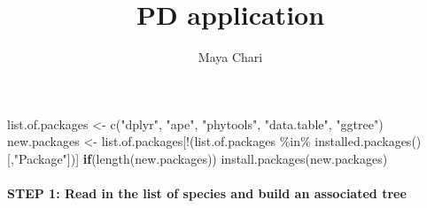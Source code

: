 \documentclass[
]{article}
\title{PD application}
\author{Maya Chari}
\date{}
\newenvironment{Shaded}{\begin{snugshade}}{\end{snugshade}}
\newcommand{\ControlFlowTok}[1]{\textcolor[rgb]{0.13,0.29,0.53}{\textbf{#1}}}
\newcommand{\FunctionTok}[1]{\textcolor[rgb]{0.00,0.00,0.00}{#1}}
\newcommand{\NormalTok}[1]{#1}
\newcommand{\OtherTok}[1]{\textcolor[rgb]{0.56,0.35,0.01}{#1}}
\newcommand{\SpecialCharTok}[1]{\textcolor[rgb]{0.00,0.00,0.00}{#1}}
\newcommand{\StringTok}[1]{\textcolor[rgb]{0.31,0.60,0.02}{#1}}
\begin{document}
\maketitle

\begin{Shaded}
\begin{Highlighting}[]
\NormalTok{list.of.packages }\OtherTok{\textless{}{-}} \FunctionTok{c}\NormalTok{(}\StringTok{"dplyr"}\NormalTok{, }\StringTok{"ape"}\NormalTok{, }\StringTok{"phytools"}\NormalTok{, }\StringTok{"data.table"}\NormalTok{, }\StringTok{"ggtree"}\NormalTok{)}
\NormalTok{new.packages }\OtherTok{\textless{}{-}}\NormalTok{ list.of.packages[}\SpecialCharTok{!}\NormalTok{(list.of.packages }\SpecialCharTok{\%in\%} \FunctionTok{installed.packages}\NormalTok{()[,}\StringTok{"Package"}\NormalTok{])]}
\ControlFlowTok{if}\NormalTok{(}\FunctionTok{length}\NormalTok{(new.packages)) }\FunctionTok{install.packages}\NormalTok{(new.packages)}
\end{Highlighting}
\end{Shaded}

\hypertarget{step-1-read-in-the-list-of-species-and-build-an-associated-tree}{%
\paragraph{STEP 1: Read in the list of species and build an associated
tree}\label{step-1-read-in-the-list-of-species-and-build-an-associated-tree}}
\end{document}
